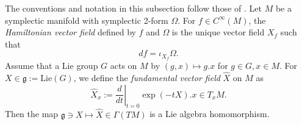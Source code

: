\documentclass[12pt,reqno,a4paper]{amsart}
\numberwithin{equation}{section}
\theoremstyle{definition}
\theoremstyle{remark}
\begin{document}
The conventions and notation in this subsection follow those of \cite[Section 7.1]{BerlineGetzlerVergne2004}. Let $M$ be a symplectic manifold with symplectic 2-form $\Omega$. For $f\in C^\infty(M)$, the \textit{Hamiltonian vector field} defined by $f$ and $\Omega$ is the unique vector field $X_f$ such that
\begin{equation}\label{hamilton}
df=\iota_{X_f}\Omega.
\end{equation}
Assume that a Lie group $G$ acts on $M$ by $(g,x)\mapsto g.x$ for $g\in G, x\in M$. For $X\in \mathfrak{g}:=\mathrm{Lie}(G)$, we define the \textit{fundamental vector field} $\widehat{X}$ on $M$ as
\begin{equation*}
\widehat{X}_x:=\left.\frac{d}{dt}\right|_{t=0}\exp(-tX).x \in T_x M.
\end{equation*}
Then the map $\mathfrak{g}\ni X\mapsto \widehat{X}\in \Gamma (TM)$ is a Lie algebra homomorphism.
\end{document}
